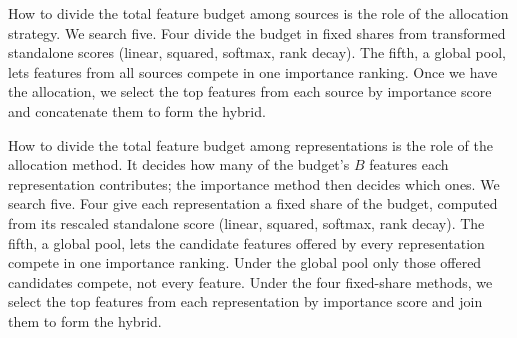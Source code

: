 
How to divide the total feature budget among sources is the role of the allocation strategy. We search five. Four divide the budget in fixed shares from transformed standalone scores (linear, squared, softmax, rank decay). The fifth, a global pool, lets features from all sources compete in one importance ranking. Once we have the allocation, we select the top features from each source by importance score and concatenate them to form the hybrid.

How to divide the total feature budget among representations is the role of the allocation method. It decides how many of the budget's $B$ features each representation contributes; the importance method then decides which ones. We search five. Four give each representation a fixed share of the budget, computed from its rescaled standalone score (linear, squared, softmax, rank decay). The fifth, a global pool, lets the candidate features offered by every representation compete in one importance ranking. Under the global pool only those offered candidates compete, not every feature. Under the four fixed-share methods, we select the top features from each representation by importance score and join them to form the hybrid.

